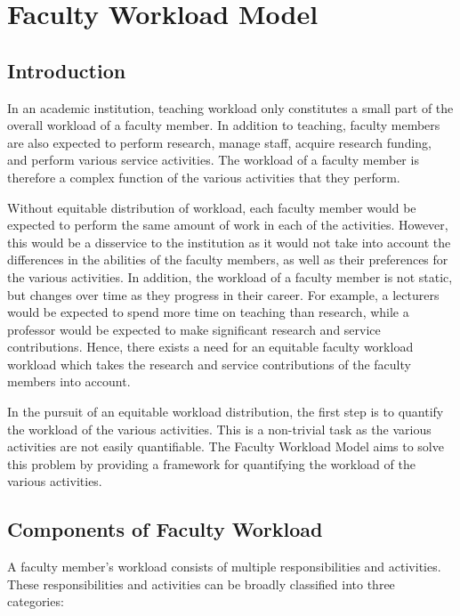 \chapter{Faculty Workload Model}

\section{Introduction}

In an academic institution, teaching workload only constitutes a small part of the overall workload of a faculty member. In addition to teaching, faculty members are also expected to perform research, manage staff, acquire research funding, and perform various service activities. The workload of a faculty member is therefore a complex function of the various activities that they perform.

Without equitable distribution of workload, each faculty member would be expected to perform the same amount of work in each of the activities. However, this would be a disservice to the institution as it would not take into account the differences in the abilities of the faculty members, as well as their preferences for the various activities. In addition, the workload of a faculty member is not static, but changes over time as they progress in their career. For example, a lecturers would be expected to spend more time on teaching than research, while a professor would be expected to make significant research and service contributions. Hence, there exists a need for an equitable faculty workload workload which takes the research and service contributions of the faculty members into account.

In the pursuit of an equitable workload distribution, the first step is to quantify the workload of the various activities. This is a non-trivial task as the various activities are not easily quantifiable. The Faculty Workload Model aims to solve this problem by providing a framework for quantifying the workload of the various activities.

\section{Components of Faculty Workload}

A faculty member's workload consists of multiple responsibilities and activities. These responsibilities and activities can be broadly classified into three categories:

